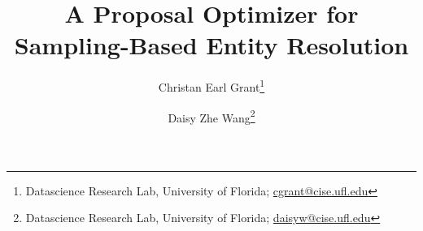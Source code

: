 \documentclass[twoside,leqno,twocolumn]{article}
\begin{document}
\title{A Proposal Optimizer for Sampling-Based Entity Resolution}

\author{%
Christan Earl Grant\thanks{Datascience Research Lab, University of Florida; \url{cgrant@cise.ufl.edu}} 
\and 
Daisy Zhe Wang\thanks{Datascience Research Lab, University of Florida; \url{daisyw@cise.ufl.edu}}}

\date{}

\maketitle























\end{document}
